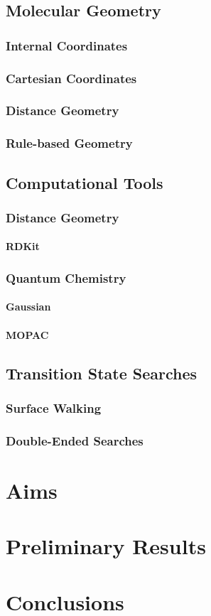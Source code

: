 \documentclass[12pt]{article}
\begin{document}
\subsection{Molecular Geometry}
\subsubsection{Internal Coordinates}
\subsubsection{Cartesian Coordinates}
\subsubsection{Distance Geometry}
\subsubsection{Rule-based Geometry}

\subsection{Computational Tools}
\subsubsection{Distance Geometry}
\paragraph{RDKit}
\subsubsection{Quantum Chemistry}
\paragraph{Gaussian}
\paragraph{MOPAC}

\subsection{Transition State Searches}
\subsubsection{Surface Walking}
\subsubsection{Double-Ended Searches}

\section{Aims}
\section{Preliminary Results}
\section{Conclusions}
\end{document}
